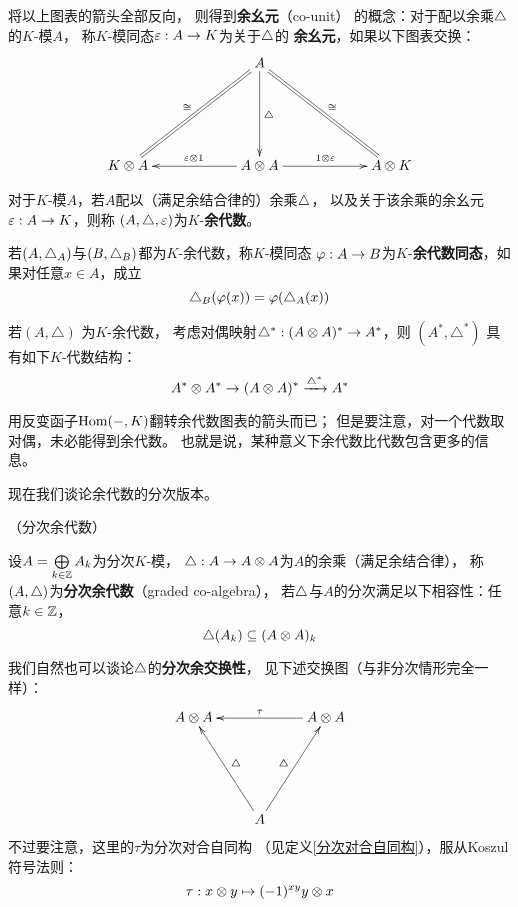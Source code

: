 将以上图表的箭头全部反向，
则得到\textbf{余幺元}（co-unit）
的概念：对于配以余乘$\triangle$的$K$-模$A$，
称$K$-模同态$\varepsilon:A\to K$为关于$\triangle$的
\textbf{余幺元}，如果以下图表交换：
$$
  \xybigrow
  \xybigcol
  \xymatrix{
     &
       A\ar@{=}[ld]_{\cong}\ar@{=}[rd]^{\cong}\ar[d]^{\yc}
     &
  \\
       K\ten A
     & A\ten A  \ar[l]_{\veps\ten 1}\ar[r]^{1\ten \veps}
     & A\ten K
  }
$$

对于$K$-模$A$，若$A$配以（满足余结合律的）余乘$\triangle$，
以及关于该余乘的余幺元$\varepsilon:A\to K$，则称
$(A,\triangle,\varepsilon)$为$K$-\textbf{余代数}。

若$(A,\triangle_A)$与$(B,\triangle_B)$都为$K$-余代数，称$K$-模同态
$\varphi:A\to B$为$K$-\textbf{余代数同态}，如果对任意$x\in A$，成立
$$\triangle_B(\varphi(x))=\varphi(\triangle_A(x))$$

\begin{rem}%
若$(A,\triangle)$ 为$K$-余代数，%
考虑对偶映射$\triangle^*:(A\otimes A)^*\to A^*$，则
$(A^*,\triangle^*)$ %
具有如下$K$-代数结构：
$$A^*\otimes A^*\to(A\otimes A)^*\xrightarrow{\triangle^*}A^*$$
\end{rem}

用反变函子$\operatorname{Hom}(-,K)$翻转余代数图表的箭头而已；
但是要注意，对一个代数取对偶，未必能得到余代数。
也就是说，某种意义下余代数比代数包含更多的信息。

现在我们谈论余代数的分次版本。

\begin{definition}（分次余代数）

设$A=\bigoplus\limits_{k\in\mathbb{Z}}A_k$为分次$K$-模，
$\triangle:A\to A\otimes A$为$A$的余乘（满足余结合律），
称$(A,\triangle)$为\textbf{分次余代数}（graded co-algebra），
若$\triangle$与$A$的分次满足以下相容性：任意$k\in\mathbb{Z}$，
$$\triangle(A_k)\subseteq (A\otimes A)_k$$
\end{definition}

我们自然也可以谈论$\triangle$的\textbf{分次余交换性}，
见下述交换图（与非分次情形完全一样）：
$$
\xybigrow
  \xymatrix{
    A\ten A
    &&
    A\ten A \ar[ll]_{\tau}
  \\
    &A \ar[ul]_{\yc}\ar[ur]^{\yc}
    &
  }
$$
不过要注意，这里的$\tau$为分次对合自同构
（见定义\ref{分次对合自同构}），服从Koszul符号法则：
$$\tau: x\otimes y\mapsto (-1)^{xy}y\otimes x$$


